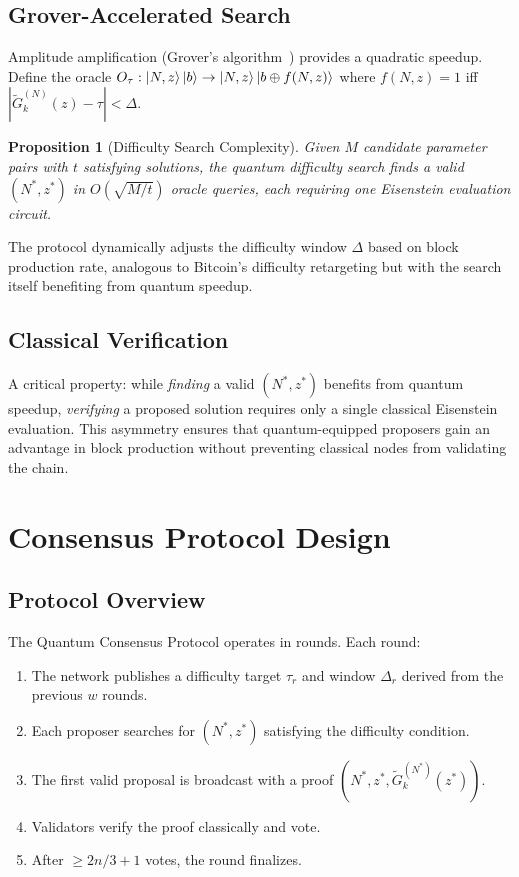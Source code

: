 \documentclass[11pt,a4paper]{article}
\newtheorem{proposition}[theorem]{Proposition}
\begin{document}
\subsection{Grover-Accelerated Search}

Amplitude amplification (Grover's algorithm~\cite{grover1996})
provides a quadratic speedup. Define the oracle
$O_\tau: \ket{N,z}\ket{b} \rightarrow \ket{N,z}\ket{b \oplus f(N,z)}$
where $f(N,z) = 1$ iff $|\tilde{G}_k^{(N)}(z) - \tau| < \Delta$.

\begin{proposition}[Difficulty Search Complexity]
Given $M$ candidate parameter pairs with $t$ satisfying solutions,
the quantum difficulty search finds a valid $(N^*, z^*)$ in
$O(\sqrt{M/t})$ oracle queries, each requiring one Eisenstein
evaluation circuit.
\end{proposition}

The protocol dynamically adjusts the difficulty window $\Delta$ based
on block production rate, analogous to Bitcoin's difficulty retargeting
but with the search itself benefiting from quantum speedup.

\subsection{Classical Verification}

A critical property: while \emph{finding} a valid $(N^*, z^*)$ benefits
from quantum speedup, \emph{verifying} a proposed solution requires only
a single classical Eisenstein evaluation. This asymmetry ensures that
quantum-equipped proposers gain an advantage in block production without
preventing classical nodes from validating the chain.

\section{Consensus Protocol Design}

\subsection{Protocol Overview}

The Quantum Consensus Protocol operates in rounds. Each round:

\begin{enumerate}[nosep]
  \item The network publishes a difficulty target $\tau_r$ and window
        $\Delta_r$ derived from the previous $w$ rounds.
  \item Each proposer searches for $(N^*, z^*)$ satisfying the
        difficulty condition.
  \item The first valid proposal is broadcast with a proof
        $(N^*, z^*, \tilde{G}_k^{(N^*)}(z^*))$.
  \item Validators verify the proof classically and vote.
  \item After $\geq 2n/3 + 1$ votes, the round finalizes.
\end{enumerate}
\end{document}

